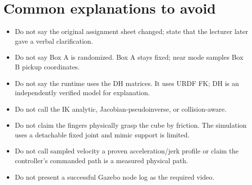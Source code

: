 \section{Common explanations to avoid}
\begin{itemize}
 \item Do not say the original assignment sheet changed; state that the
 lecturer later gave a verbal clarification.
 \item Do not say Box A is randomized. Box A stays fixed; near mode samples
 Box B pickup coordinates.
 \item Do not say the runtime uses the DH matrices. It uses URDF FK; DH is
 an independently verified model for explanation.
 \item Do not call the IK analytic, Jacobian-pseudoinverse, or collision-aware.
 \item Do not claim the fingers physically grasp the cube by friction. The
 simulation uses a detachable fixed joint and mimic support is limited.
 \item Do not call sampled velocity a proven acceleration/jerk profile or
 claim the controller's commanded path is a measured physical path.
 \item Do not present a successful Gazebo node log as the required video.
\end{itemize}
